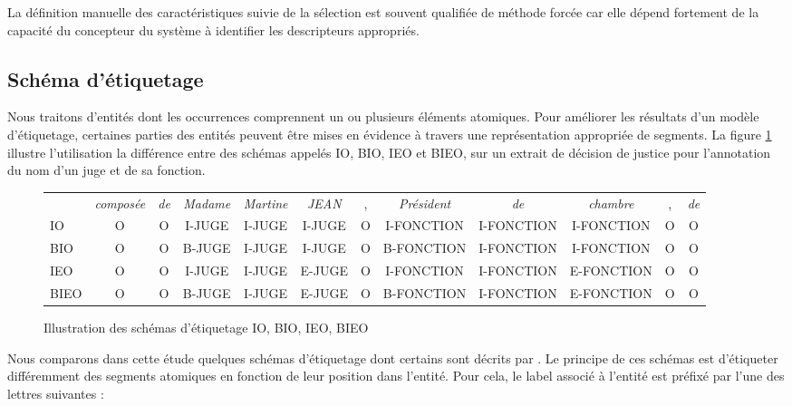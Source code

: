 La définition manuelle des caractéristiques suivie de la sélection est souvent qualifiée de méthode forcée car elle dépend fortement de la capacité du concepteur du système à identifier les descripteurs appropriés. 


\subsection{Schéma d'étiquetage}
Nous traitons d'entités dont les occurrences comprennent un ou plusieurs éléments atomiques. Pour améliorer les résultats d'un modèle d'étiquetage, certaines parties des entités peuvent être mises en évidence à travers une représentation appropriée de segments. La figure \ref{p4_sample-tagmod} illustre l'utilisation la différence entre des schémas appelés IO, BIO, IEO et BIEO, sur un extrait de décision de justice pour l'annotation du nom d'un juge et de sa fonction.
\begin{figure}[!ht]
	\scriptsize
	\begin{tabular}{l|ccccccccccc}
		& \textit{composée} & \textit{de} & \textit{Madame} & \textit{Martine} & \textit{JEAN} & , & \textit{Président} & \textit{de} & \textit{chambre} & , & \textit{de} \\ 
		IO & O & O & I-JUGE & I-JUGE & I-JUGE & O & I-FONCTION & I-FONCTION & I-FONCTION & O & O \\
		BIO & O & O & B-JUGE & I-JUGE & I-JUGE & O & B-FONCTION & I-FONCTION & I-FONCTION & O & O \\
		IEO & O & O & I-JUGE & I-JUGE & E-JUGE & O & I-FONCTION & I-FONCTION & E-FONCTION & O & O \\
		BIEO & O & O & B-JUGE & I-JUGE & E-JUGE & O & B-FONCTION & I-FONCTION & E-FONCTION & O & O \\
	\end{tabular}
	\caption{Illustration des schémas d'étiquetage IO, BIO, IEO, BIEO}\label{p4_sample-tagmod}
\end{figure}

Nous comparons dans cette étude quelques schémas d'étiquetage dont certains sont décrits par \citet{konkol2015tagModel}. Le principe de ces schémas est d'étiqueter différemment des segments atomiques en fonction de leur position dans l'entité. Pour cela, le label associé à l'entité est préfixé par l'une des lettres suivantes :

